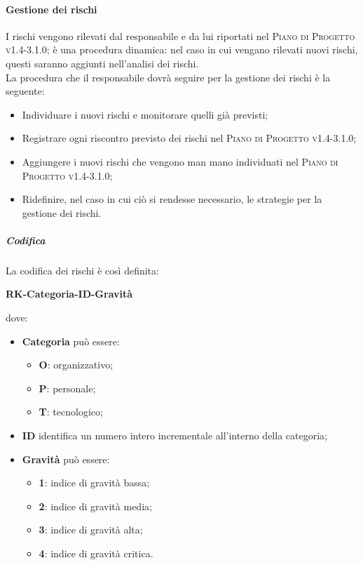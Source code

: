 \documentclass[../norme-di-progetto.tex]{subfiles}
\begin{document}
\paragraph{Gestione dei rischi}
I rischi vengono rilevati dal responsabile e da lui riportati nel \textsc{Piano di Progetto v1.4-3.1.0}; è una procedura dinamica: nel caso in cui vengano rilevati nuovi rischi, questi saranno aggiunti nell'analisi dei rischi. \\
La procedura che il responsabile dovrà seguire per la gestione dei rischi è la seguente:
\begin{itemize}
  \item Individuare i nuovi rischi e monitorare quelli già previsti;
  \item Registrare ogni riscontro previsto dei rischi nel \textsc{Piano di Progetto v1.4-3.1.0};
  \item Aggiungere i nuovi rischi che vengono man mano individuati nel \textsc{Piano di Progetto v1.4-3.1.0};
  \item Ridefinire, nel caso in cui ciò si rendesse necessario, le strategie per la gestione dei rischi.
\end{itemize}
\subparagraph*{Codifica}
La codifica dei rischi è così definita: \\
\begin{center}
\centering
\textbf{RK-Categoria-ID-Gravità}
\end{center} dove:
\begin{itemize}
  \item \textbf{Categoria} può essere:
  \begin{itemize}
    \item \textbf{O}: organizzativo;
    \item \textbf{P}: personale;
    \item \textbf{T}: tecnologico;
  \end{itemize}
  \item \textbf{ID} identifica un numero intero incrementale all'interno della categoria;
  \item \textbf{Gravità} può essere:
  \begin{itemize}
    \item \textbf{1}: indice di gravità bassa;
    \item \textbf{2}: indice di gravità media;
    \item \textbf{3}: indice di gravità alta;
    \item \textbf{4}: indice di gravità critica.
  \end{itemize}
\end{itemize}
\end{document}
